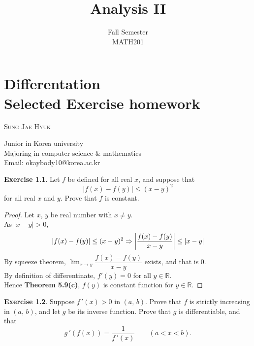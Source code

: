 \documentclass[12pt]{book}
\title{Analysis II}
\author{Fall Semester\\MATH201}
\date{}
\makeatletter
\theoremstyle{definition}
\newtheorem{exercise}{Exercise}
\newcommand{\R}{\mathbb{R}}
\newcommand{\chapterauthor}[1]{%
  {\parindent0pt\vspace*{-25pt}%
  \linespread{1.1}\large\scshape#1%
  \par\nobreak\vspace*{35pt}}
  \@afterheading%
}
\newcommand{\chapterother}[1]{%
  {\parindent0pt\vspace*{-25pt}%
  \linespread{1.1}#1%
  \par\nobreak\vspace*{35pt}}
  \@afterheading%
}
\makeatother
\begin{document}
	\chapter{Differentation\\Selected Exercise homework}
	\chapterauthor{Sung Jae Hyuk}
	\chapterother{Junior in Korea university\\ Majoring in computer science \& mathematics\\Email: okaybody10@korea.ac.kr}
	\newpage
	\begin{exercise}
		Let $f$ be defined for all real $x$, and suppose that
		\begin{equation*}
			|f(x)-f(y)|\leq (x-y)^2
		\end{equation*}
		for all real $x$ and $y$. Prove that $f$ is constant.
	\end{exercise}
	\begin{proof}
		Let $x$, $y$ be real number with $x\neq y$.\\
		As $|x-y|>0$,
		\begin{equation*}
			|f(x)-f(y)|\leq(x-y)^2\\
			\Rightarrow \left\vert \dfrac{f(x)-f(y)}{x-y}\right\vert\leq |x-y|
		\end{equation*}
		By squeeze theorem, $\displaystyle\lim_{x\rightarrow y} \dfrac{f(x)-f(y)}{x-y}$ exists, and that is $0$.\\
		By definition of differentinate, $f'(y)=0$ for all $y\in\R$.\\
		Hence \textbf{Theorem 5.9(c)}, $f(y)$ is constant function for $y\in\R$.
	\end{proof}
	\newpage
	\begin{exercise}
		Suppose $f\,'(x)>0$ in $(a,\,b)$. Prove that $f$ is strictly increasing in $(a,\,b)$, and let $g$ be its inverse function. Prove that $g$ is differentiable, and that
		\begin{equation*}
			g\,'(f(x))=\dfrac{1}{f\,'(x)}\qquad (a<x<b).
		\end{equation*}
	\end{exercise}
\end{document}
